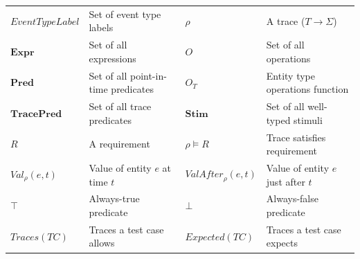 \begin{center}
\begin{tabular}{ll|ll}
        $\mathit{EventTypeLabel}$      & Set of event type labels                   & $\rho$                       & A trace ($T \to \Sigma$) \\
        $\mathbf{Expr}$                & Set of all expressions                     & $O$                          & Set of all operations \\
        $\mathbf{Pred}$                & Set of all point-in-time predicates        & $O_T$                        & Entity type operations function \\
        $\mathbf{TracePred}$           & Set of all trace predicates                & $\mathbf{Stim}$              & Set of all well-typed stimuli \\
        $R$                            & A requirement                              & $\rho \models R$             & Trace satisfies requirement \\
        $\mathit{Val}_\rho(e,t)$       & Value of entity $e$ at time $t$            & $\mathit{ValAfter}_\rho(e,t)$ & Value of entity $e$ just after $t$ \\
        $\top$                         & Always-true predicate                      & $\bot$                       & Always-false predicate \\
        $\mathit{Traces}(\mathit{TC})$ & Traces a test case allows                  & $\mathit{Expected}(\mathit{TC})$ & Traces a test case expects \\
        \bottomrule
    \end{tabular}
\end{center}
